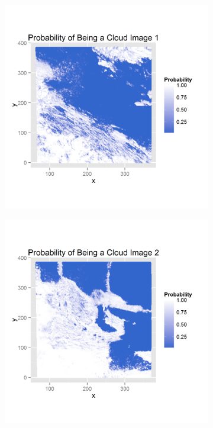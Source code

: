 \documentclass{article}\usepackage[]{graphicx}\usepackage[]{color}
\begin{document}
\begin{figure}[h]
  \centering 
  \begin{subfigure}[b]{0.3\textwidth}
    \includegraphics[width=\linewidth]{qda1_prob.png}
    \label{qda1}
  \end{subfigure} 
  \begin{subfigure}[b]{0.3\textwidth}
    \includegraphics[width=\linewidth]{qda2_prob.png}

\end{subfigure}
\end{figure}
\end{document}
